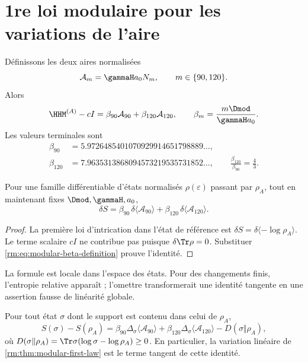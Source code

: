 \section{1re loi modulaire pour les variations de l’aire}

Définissons les deux aires normalisées
\begin{equation}
\label{rm:eq:modular-normalized-area-channels}
\mathcal A_m=\gammaH a_0N_m,
\qquad m\in\{90,120\}.
\end{equation}
Alors
\begin{equation}
\label{rm:eq:modular-beta-definition}
\HHM^{(A)}-cI
=\beta_{90}\mathcal A_{90}+\beta_{120}\mathcal A_{120},
\qquad
\beta_m=\frac{m\Dmod}{\gammaH a_0}.
\end{equation}
Les valeurs terminales sont
\begin{align}
\beta_{90}&=5.9726485401070929914651798889\ldots,
\label{rm:eq:modular-beta90}\\
\beta_{120}&=7.9635313868094573219535731852\ldots,
\qquad
\frac{\beta_{120}}{\beta_{90}}=\frac43.
\label{rm:eq:modular-beta120}
\end{align}

\begin{theorem}
\label{rm:thm:modular-first-law}
Pour une famille différentiable d’états normalisés \(\rho(\varepsilon)\) passant par \(\rho_A\), tout en maintenant fixes \(\Dmod,\gammaH,a_0\),
\begin{equation}
\label{rm:eq:modular-first-law}
\boxed{
\delta S
=\beta_{90}\,\delta\langle\mathcal A_{90}\rangle
+\beta_{120}\,\delta\langle\mathcal A_{120}\rangle.}
\end{equation}
\end{theorem}

\begin{proof}
La première loi d’intrication dans l’état de référence est \(\delta S=\delta\langle-\log\rho_A\rangle\). Le terme scalaire \(cI\) ne contribue pas puisque \(\delta\Tr\rho=0\). Substituer \cref{rm:eq:modular-beta-definition} prouve l’identité.
\end{proof}

La formule est locale dans l’espace des états. Pour des changements finis, l’entropie relative apparaît ; l’omettre transformerait une identité tangente en une assertion fausse de linéarité globale.

\begin{theorem}
\label{rm:thm:modular-finite-first-law}
Pour tout état \(\sigma\) dont le support est contenu dans celui de \(\rho_A\),
\begin{equation}
\label{rm:eq:modular-finite-first-law}
\boxed{
S(\sigma)-S(\rho_A)
=\beta_{90}\Delta_\sigma\langle\mathcal A_{90}\rangle
+\beta_{120}\Delta_\sigma\langle\mathcal A_{120}\rangle
-D(\sigma\Vert\rho_A),}
\end{equation}
où \(D(\sigma\Vert\rho_A)=\Tr\sigma(\log\sigma-\log\rho_A)\geq0\).
En particulier, la variation linéaire de \cref{rm:thm:modular-first-law} est le terme tangent de cette identité.
\end{theorem}

